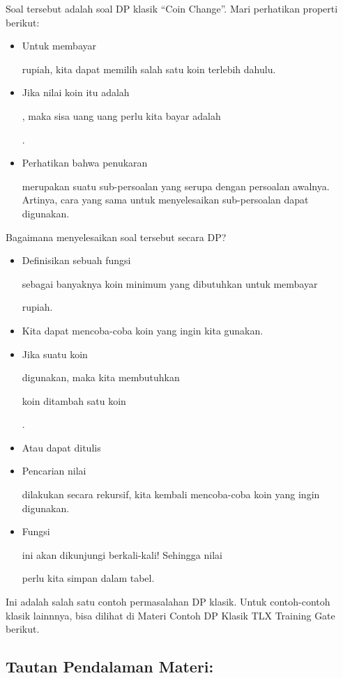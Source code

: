 \documentclass[]{article}
\providecommand{\tightlist}{%
  \setlength{\itemsep}{0pt}\setlength{\parskip}{0pt}}
\begin{document}
Soal tersebut adalah soal DP klasik ``Coin Change''. Mari perhatikan
properti berikut:

\begin{itemize}
\tightlist
\item
  Untuk membayar

  rupiah, kita dapat memilih salah satu koin terlebih dahulu.
\item
  Jika nilai koin itu adalah

  , maka sisa uang uang perlu kita bayar adalah

  .
\item
  Perhatikan bahwa penukaran

  merupakan suatu sub-persoalan yang serupa dengan persoalan awalnya.
  Artinya, cara yang sama untuk menyelesaikan sub-persoalan dapat
  digunakan.
\end{itemize}

Bagaimana menyelesaikan soal tersebut secara DP?

\begin{itemize}
\tightlist
\item
  Definisikan sebuah fungsi

  sebagai banyaknya koin minimum yang dibutuhkan untuk membayar

  rupiah.
\item
  Kita dapat mencoba-coba koin yang ingin kita gunakan.
\item
  Jika suatu koin

  digunakan, maka kita membutuhkan

  koin ditambah satu koin

  .
\item
  Atau dapat ditulis
\item
  Pencarian nilai

  dilakukan secara rekursif, kita kembali mencoba-coba koin yang ingin
  digunakan.
\item
  Fungsi

  ini akan dikunjungi berkali-kali! Sehingga nilai

  perlu kita simpan dalam tabel.
\end{itemize}

Ini adalah salah satu contoh permasalahan DP klasik. Untuk contoh-contoh
klasik lainnnya, bisa dilihat di Materi Contoh DP Klasik TLX Training
Gate berikut.

\subsection{Tautan Pendalaman Materi:}\label{tautan-pendalaman-materi}
\end{document}
